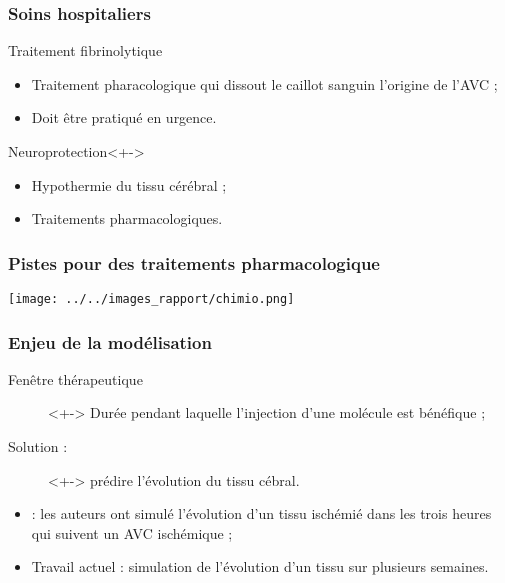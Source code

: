 \subsubsection{Soins hospitaliers}

\begin{frame}
\begin{block}{Traitement fibrinolytique}
\begin{itemize}
\item<+-> Traitement pharacologique qui dissout le caillot sanguin  l'origine de l'AVC ;
\item<+-> Doit \^etre pratiqu\'e en urgence.
\end{itemize}
\end{block}
%
\begin{block}{Neuroprotection}<+->
\begin{itemize}
\item<+-> Hypothermie du tissu c\'er\'ebral ;
\item<+-> Traitements pharmacologiques.
\end{itemize}
\end{block}
\end{frame}

\begin{frame}
\frametitle{Pistes pour des traitements pharmacologique}

\texttt{[image: ../../images\_rapport/chimio.png]}
\end{frame}

\subsubsection{Enjeu de la mod\'elisation}

\begin{frame}
\begin{description}
\item[Fen\^etre th\'erapeutique]<+-> Dur\'ee pendant laquelle l'injection d'une mol\'ecule est b\'en\'efique ;
\item[Solution : ]<+-> pr\'edire l'\'evolution du tissu c\'ebral.
\end{description}
\end{frame}

\begin{frame}
\begin{itemize}
\item<+-> \cite{Duval_JCBFM_02} : les auteurs ont simul\'e l'\'evolution d'un tissu isch\'emi\'e dans les trois heures qui suivent un AVC isch\'emique ;
\item<+-> Travail actuel : simulation de l'\'evolution d'un tissu sur plusieurs semaines.
\end{itemize}
\end{frame}




